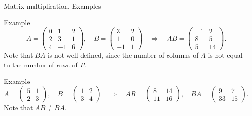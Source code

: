\documentclass[9pt]{beamer}
\begin{document}
\begin{frame}{Matrix multiplication. Examples}

    \begin{block}{Example}
        $$
        A =
        \begin{pmatrix}
        0 & 1  & 2 \\
        2 & 3  & 1 \\
        4 & -1 & 6 
        \end{pmatrix},\quad 
        B =
        \begin{pmatrix}
         3 & 2  \\
         1 & 0 \\
        -1 & 1
        \end{pmatrix}\quad \Longrightarrow\quad
        AB = 
        \begin{pmatrix}
        -1 & 2  \\
         8 & 5 \\
         5 & 14
        \end{pmatrix}.
        $$
        Note that $BA$ is not well defined, since the number of columns of $A$ is not equal to the number of rows of $B$.
    \end{block}

    \begin{block}{Example}
        $$
        A = 
        \begin{pmatrix}
        5  & 1  \\
        2  & 3
        \end{pmatrix},\quad
        B = \begin{pmatrix}
        1  & 2  \\
        3  & 4
        \end{pmatrix}\quad \Longrightarrow\quad
        AB = 
        \begin{pmatrix}
         8 & 14  \\
        11 & 16
        \end{pmatrix},\quad
        BA = \begin{pmatrix}
        9  & 7  \\
        33 & 15
        \end{pmatrix}.
        $$
        Note that $AB \neq BA$.
    \end{block}
    
\end{frame}
\end{document}

